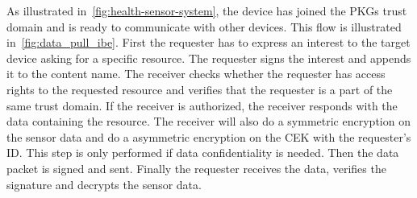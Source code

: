As illustrated in~\autoref{fig:health-sensor-system}, the device has joined the \gls{PKG}s trust domain and is ready to communicate with other devices.
This flow is illustrated in~\autoref{fig:data_pull_ibe}.
First the requester has to express an \gls{interest} to the target device asking for a specific resource. 
The requester signs the \gls{interest} and appends it to the content \gls{name}.
The \gls{receiver} checks whether the requester has access rights to the requested resource and verifies that the requester is a part of the same trust domain.
If the \gls{receiver} is authorized, the \gls{receiver} responds with the \gls{data} containing the resource. 
The \gls{receiver} will also do a symmetric encryption on the sensor \gls{data} and do a asymmetric encryption on the \gls{CEK} with the requester's \gls{ID}.
This step is only performed if \gls{data} confidentiality is needed. 
Then the \gls{data} packet is signed and sent.
Finally the requester receives the \gls{data}, verifies the signature and decrypts the sensor \gls{data}.

